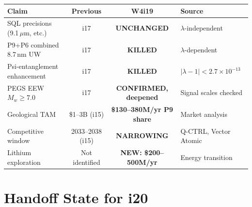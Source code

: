 \documentclass[11pt]{article}
\theoremstyle{definition}
\theoremstyle{remark}
\newcommand{\ee}[1]{\times10^{#1}}
\begin{document}
\begin{center}
\begin{tabular}{lccl}
\toprule
\textbf{Claim} & \textbf{Previous} & \textbf{W4i19} & \textbf{Source} \\
\midrule
SQL precisions (9.1\,$\mu$m, etc.) & i17 & \textbf{UNCHANGED} & $\lambda$-independent \\
P9+P6 combined 8.7\,nm UW & i17 & \textbf{KILLED} & $\lambda$-dependent \\
Psi-entanglement enhancement & i17 & \textbf{KILLED} & $|\lambda-1| < 2.7\ee{-13}$ \\
PEGS EEW $M_w \geq 7.0$ & i17 & \textbf{CONFIRMED, deepened} & Signal scales checked \\
Geological TAM & \$1--3B (i15) & \textbf{\$130--380M/yr P9 share} & Market analysis \\
Competitive window & 2033--2038 (i15) & \textbf{NARROWING} & Q-CTRL, Vector Atomic \\
Lithium exploration & Not identified & \textbf{NEW: \$200--500M/yr} & Energy transition \\
\bottomrule
\end{tabular}
\end{center}

\section*{Handoff State for i20}
\end{document}
